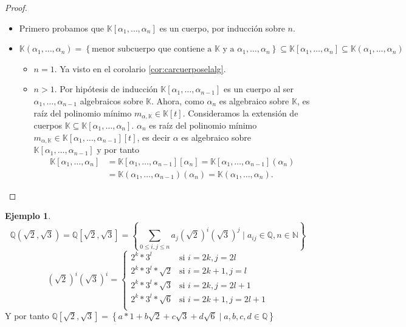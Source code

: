 \documentclass[10pt, spanish]{report}
\theoremstyle{definition}
\newtheorem*{ej}{Ejemplo}
\newcommand{\N}{\mathbb{N}}
\newcommand{\Q}{\mathbb{Q}}
\newcommand{\K}{\mathbb{K}}
\renewcommand{\leq}{\leqslant}
\begin{document}
\begin{proof}\hspace{0pt}
    \begin{itemize}
        \item Primero probamos que $\K[\alpha_1,\ldots,\alpha_n]$ es un cuerpo, por
    inducción sobre $n$.
    \item $\K(\alpha_1,\ldots,\alpha_n)=\left\{\text{menor subcuerpo que contiene a } \K \text{ y a } \alpha_1,\ldots,\alpha_n\right\}\subseteq\K[\alpha_1,\ldots,\alpha_n]\subseteq
    \K(\alpha_1,\ldots,\alpha_n)$
    \begin{itemize}
        \item $n=1$. Ya visto en el corolario \ref{cor:carcuerposelalg}.
        \item $n>1$. Por hipótesis de inducción
            $\K[\alpha_1,\ldots,\alpha_{n-1}]$ es un cuerpo al ser
            $\alpha_1,\ldots,\alpha_{n-1}$ algebraicos sobre $\K$. Ahora, como
            $\alpha_n$ es algebraico sobre $\K$, es raíz del polinomio mínimo
            $m_{\alpha,\K}\in \K[t]$. Consideramos la extensión de cuerpos
            $\K\subseteq\K[\alpha_1,\ldots,\alpha_n]$. $\alpha_n$ es raíz del
            polinomio mínimo $m_{\alpha,\K}\in
            \K[\alpha_1,\ldots,\alpha_{n-1}][t]$, es decir $\alpha$ es
            algebraico sobre $\K[\alpha_1,\ldots,\alpha_{n-1}]$ y por tanto
            \begin{align*}
                \K[\alpha_1,\ldots,\alpha_{n}]
                &=\K[\alpha_1,\ldots,\alpha_{n-1}][\alpha_n]
                =\K[\alpha_1,\ldots,\alpha_{n-1}](\alpha_n)\\
                &=\K(\alpha_1,\ldots,\alpha_{n-1})(\alpha_n)
                =\K(\alpha_1,\ldots,\alpha_n).
            \end{align*}
    \end{itemize}\vspace{-1em}
    \end{itemize}\vspace{-1.75em}
\end{proof}

\begin{ej}
    \[\Q(\sqrt{2},\sqrt{3})=\Q[\sqrt{2},\sqrt{3}]=\left\{ \sum_{0\leq
    i,j\leq n} a_j(\sqrt{2})^i(\sqrt{3})^j\mid a_{ij}\in\Q,n\in\N\right\}\]
    \[(\sqrt{2})^i(\sqrt{3})^i=\begin{cases}
        2^k*3^l &\text{si } i=2k, j=2l\\
        2^k*3^l*\sqrt{2}&\text{si } i=2k+1,j=l\\
        2^k*3^l*\sqrt{3}&\text{si } i=2k,j=2l+1\\
        2^k*3^l*\sqrt{6}&\text{si } i=2k+1,j=2l+1\\
    \end{cases}\]
    Y por tanto $\Q[\sqrt{2},\sqrt{3}]=\left\{
    a*1+b\sqrt{2}+c\sqrt{3}+d\sqrt{6}\mid a,b,c,d\in \Q    \right\} $
\end{ej}
\end{document}

